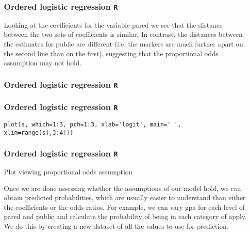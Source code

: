 \documentclass[00-GLMregslides.tex]{subfiles}
\begin{document}
\begin{frame}[fragile]
	\frametitle{Ordered logistic regression \texttt{R} }
	\Large
	Looking at the coefficients for the variable pared we see that the distance between the two sets of coefficients is similar. In contrast, the distances between the estimates for public are different (i.e. the markers are much further apart on the second line than on the first), suggesting that the proportional odds assumption may not hold.
\end{frame}
\begin{frame}[fragile]
	\frametitle{Ordered logistic regression \texttt{R} }
	\Large
\end{frame}

\begin{frame}[fragile]
	\frametitle{Ordered logistic regression \texttt{R} }
	\Large
\begin{framed}
\begin{verbatim}
plot(s, which=1:3, pch=1:3, xlab='logit', main=' ', xlim=range(s[,3:4]))
\end{verbatim}
\end{framed}
\end{frame}

\begin{frame}[fragile]
	\frametitle{Ordered logistic regression \texttt{R} }
	\Large
	
Plot viewing proportional odds assumption


Once we are done assessing whether the assumptions of our model hold, we can obtain predicted probabilities, which are usually easier to understand than either the coefficients or the odds ratios. For example, we can vary gpa for each level of pared and public and calculate the probability of being in each category of apply. We do this by creating a new dataset of all the values to use for prediction.
\end{frame}
\end{document}
